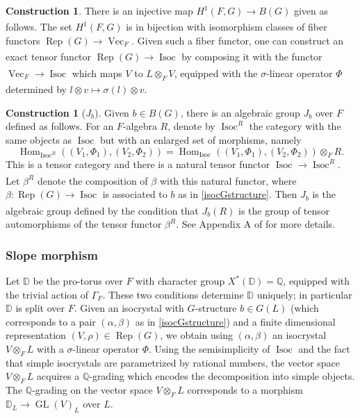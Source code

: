 \documentclass[11pt,a4paper]{article}
\theoremstyle{definition}
\newtheorem{const}[shared]{Construction}
\theoremstyle{plain}
\theoremstyle{remark}
\theoremstyle{plain}
\DeclareMathOperator{\Isoc}{Isoc}
\DeclareMathOperator{\Rep}{Rep}
\DeclareMathOperator{\Vect}{Vec}
\DeclareMathOperator{\Hom}{Hom}
\DeclareMathOperator{\GL}{GL}
\begin{document}
\begin{const}\label{cohomisocrystal}
    There is an injective map $H^1(F, G) \xrightarrow[]{} B(G)$ given as follows. The set $H^1(F, G)$ is in bijection with isomorphism classes of fiber functors $\Rep(G) \xrightarrow[]{} \Vect_F$. Given such a fiber functor, one can construct an exact tensor functor $\Rep(G) \xrightarrow[]{} \Isoc$ by composing it with the functor $\Vect_F \xrightarrow[]{} \Isoc$ which maps $V$ to $L \otimes_F V$, equipped with the $\sigma$-linear operator $\Phi$ determined by $l \otimes v \mapsto \sigma(l) \otimes v$.
\end{const}

\begin{const}[$J_b$]\label{J}
    Given $b \in B(G)$, there is an algebraic group $J_b$ over $F$ defined as follows. For an $F$-algebra $R$, denote by $\Isoc^R$ the category with the same objects as $\Isoc$ but with an enlarged set of morphisms, namely
    $$\Hom_{\Isoc^R}((V_1,\Phi_1),(V_2,\Phi_2)) = \Hom_{\Isoc}((V_1, \Phi_1), (V_2, \Phi_2)) \otimes_F R.$$
    This is a tensor category and there is a natural tensor functor $\Isoc \xrightarrow[]{} \Isoc^R$. Let $\beta^R$ denote the composition of $\beta$ with this natural functor, where $\beta: \Rep(G) \xrightarrow[]{} \Isoc$ is associated to $b$ as in \ref{isocGstructure}. Then $J_b$ is the algebraic group defined by the condition that $J_b(R)$ is the group of tensor automorphisms of the tensor functor $\beta^R$. See Appendix A of \cite{MR1485921} for more details.
\end{const}

\subsubsection{Slope morphism}
Let $\mathbb{D}$ be the pro-torus over $F$ with character group $X^*(\mathbb{D}) = \mathbb{Q}$, equipped with the trivial action of $\Gamma_F$. These two conditions determine $\mathbb{D}$ uniquely; in particular $\mathbb{D}$ is split over $F$. Given an isocrystal with $G$-structure $b \in G(L)$ (which corresponds to a pair $(\alpha, \beta)$ as in \ref{isocGstructure}) and a finite dimensional representation $(V,\rho) \in \Rep(G)$, we obtain using $(\alpha, \beta)$ an isocrystal $V \otimes_F L$ with a $\sigma$-linear operator $\Phi$. Using the semisimplicity of $\Isoc$ and the fact that simple isocrystals are parametrized by rational numbers, the vector space $V \otimes_F L$ acquires a $\mathbb{Q}$-grading which encodes the decomposition into simple objects. The $\mathbb{Q}$-grading on the vector space $V \otimes_F L$ corresponds to a morphism $\mathbb{D}_L \xrightarrow{} \GL(V)_L$ over $L$.
\end{document}
